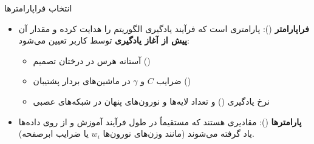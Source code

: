 \begin{frame}{انتخاب فراپارامترها}{}
  \begin{itemize}
    \setlength{\itemsep}{10pt}
    \item \textbf{فراپارامتر} (): پارامتری است که فرآیند یادگیری الگوریتم را هدایت کرده و مقدار آن \textbf{پیش از آغاز یادگیری} توسط کاربر تعیین می‌شود:
    \begin{itemize}
      \setlength{\itemsep}{3pt}
      \item آستانه هرس در درختان تصمیم ()
      \item ضرایب $C$ و $\gamma$ در ماشین‌های بردار پشتیبان ()
      \item نرخ یادگیری () و تعداد لایه‌ها و نورون‌های پنهان در شبکه‌های عصبی
    \end{itemize}
    \item \textbf{پارامترها} (): مقادیری هستند که مستقیماً در طول فرآیند آموزش و از روی داده‌ها یاد گرفته می‌شوند (مانند وزن‌های نورون‌ها $w_i$ یا ضرایب ابرصفحه).
  \end{itemize}
\end{frame}

